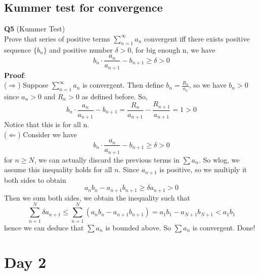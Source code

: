 \documentclass{article}
\begin{document}
\subsection{Kummer test for convergence}
\textbf{Q5} (Kummer Test)\\
Prove that series of positive terms $\sum_{n=1}^{\infty}a_n$ convergent iff there exists positive sequence
$\{b_n\}$ and positive number $\delta > 0$, for big enough n, we have
$$
b_n \cdot \frac{a_n}{a_{n+1}} - b_{n+1} \geq \delta > 0
$$
\textbf{Proof}: \\
($\Longrightarrow$) Suppose $\sum_{n=1}^{\infty}a_n$ is convergent. Then define $b_n = \frac{R_n}{a_n}$, so we have
$b_n > 0$ since $a_n >0 $ and $R_n > 0$ as defined before. So, 
$$
b_n \cdot \frac{a_n}{a_{n+1}} - b_{n+1} = \frac{R_n}{a_{n+1}} - \frac{R_{n+1}}{a_{n+1}} = 1 > 0
$$
Notice that this is for all n.\\
($\Longleftarrow$) Consider we have 
$$
b_n \cdot \frac{a_n}{a_{n+1}} - b_{n+1} \geq \delta > 0
$$
for $n \geq N$, we can actually discard the previous terms in $\sum a_n $. So wlog, we assume this 
inequality holds for all $n$. Since $a_{n+1}$ is positive, so we multiply it both sides to obtain 
$$
a_n b_n - a_{n+1} b_{n+1} \geq \delta a_{n+1} > 0
$$ 
Then we sum both sides, we obtain the inequality such that 
$$
\sum_{n=1}^{N}\delta a_{n+1} \leq \sum_{n=1}^{N} (a_n b_n- a_{n+1} b_{n+1}) = a_1 b_1 - a_{N+1} b_{N+1} < a_1 b_1
$$
hence we can deduce that $\sum a_n$ is bounded above. So $\sum a_n$ is convergent. Done!
\newpage
\section{Day 2}
\end{document}
